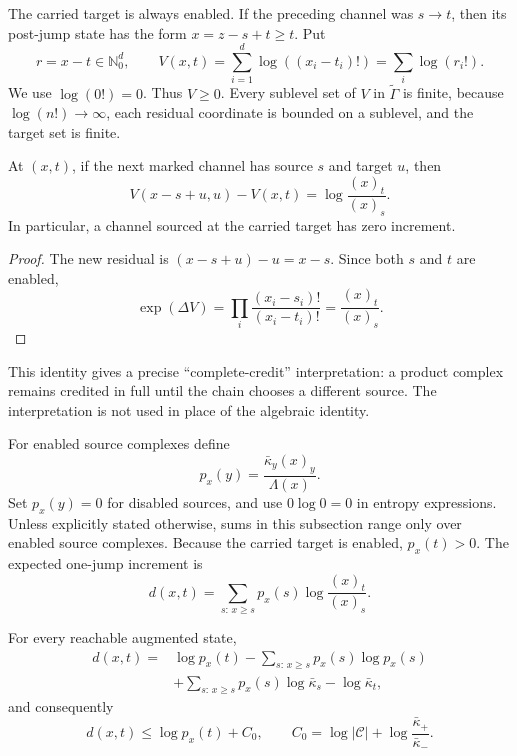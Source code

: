 The carried target is always enabled.  If the preceding channel was
\(s\to t\), then its post-jump state has the form \(x=z-s+t\ge t\).  Put
\begin{equation}\label{eq:residual}
  r=x-t\in\mathbb N_0^d,
  \qquad
  V(x,t)=\sum_{i=1}^d\log((x_i-t_i)!)=\sum_i\log(r_i!).
\end{equation}
We use \(\log(0!)=0\).  Thus \(V\ge0\).  Every sublevel set of \(V\) in
\(\widetilde\Gamma\) is finite, because \(\log(n!)\to\infty\), each residual
coordinate is bounded on a sublevel, and the target set is finite.

\begin{lemma}\label{lem:identity}
At \((x,t)\), if the next marked channel has source \(s\) and target \(u\),
then
\begin{equation}\label{eq:identity}
  V(x-s+u,u)-V(x,t)=\log\frac{(x)_t}{(x)_s}.
\end{equation}
In particular, a channel sourced at the carried target has zero increment.
\end{lemma}

\begin{proof}
The new residual is \((x-s+u)-u=x-s\).  Since both \(s\) and \(t\) are
enabled,
\[
 \exp(\Delta V)
 =\prod_i\frac{(x_i-s_i)!}{(x_i-t_i)!}
 =\frac{(x)_t}{(x)_s}.
\]
\end{proof}

This identity gives a precise ``complete-credit'' interpretation: a product
complex remains credited in full until the chain chooses a different source.
The interpretation is not used in place of the algebraic identity.

For enabled source complexes define
\begin{equation}\label{eq:source-prob}
  p_x(y)=\frac{\bar\kappa_y(x)_y}{\Lambda(x)}.
\end{equation}
Set \(p_x(y)=0\) for disabled sources, and use \(0\log0=0\) in entropy
expressions.  Unless explicitly stated otherwise, sums in this subsection
range only over enabled source complexes.  Because the carried target is
enabled, \(p_x(t)>0\).  The expected one-jump increment is
\begin{equation}\label{eq:d-def}
  d(x,t)=\sum_{s:\,x\ge s}p_x(s)
  \log\frac{(x)_t}{(x)_s}.
\end{equation}

\begin{lemma}\label{lem:entropy}
For every reachable augmented state,
\begin{equation}\label{eq:entropy-identity}
\begin{split}
  d(x,t)
  ={}&\log p_x(t)-\sum_{s:\,x\ge s} p_x(s)\log p_x(s)\\
    &+\sum_{s:\,x\ge s} p_x(s)\log\bar\kappa_s
      -\log\bar\kappa_t,
\end{split}
\end{equation}
and consequently
\begin{equation}\label{eq:entropy-bound}
  d(x,t)\le\log p_x(t)+C_0,
  \qquad
  C_0=\log|\mathcal C|+
  \log\frac{\bar\kappa_+}{\bar\kappa_-}.
\end{equation}
\end{lemma}

